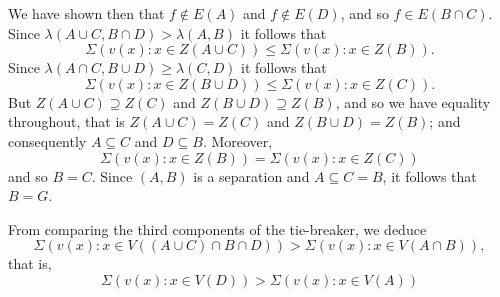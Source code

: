 We have shown then that $f \notin E(A)$ and $f \notin E(D)$, and so $f \in E(B \cap C)$. Since $\lambda(A \cup C, B \cap D) > \lambda(A, B)$ it follows that
\begin{equation*}
\Sigma(v(x) : x \in Z(A \cup C)) \le \Sigma(v(x) : x \in Z(B)).
\end{equation*}
Since $\lambda(A \cap C, B \cup D) \ge \lambda(C, D)$ it follows that
\begin{equation*}
\Sigma(v(x) : x \in Z(B \cup D)) \le \Sigma(v(x) : x \in Z(C)).
\end{equation*}
But $Z(A \cup C) \supseteq Z(C)$ and $Z(B \cup D) \supseteq Z(B)$, and so we have equality throughout, that is $Z(A \cup C) = Z(C)$ and $Z(B \cup D) = Z(B)$; and consequently $A \subseteq C$ and $D \subseteq B$. Moreover,
\begin{equation*}
\Sigma(v(x) : x \in Z(B)) = \Sigma(v(x) : x \in Z(C))
\end{equation*}
and so $B = C$. Since $(A, B)$ is a separation and $A \subseteq C = B$, it follows that $B = G$.

From comparing the third components of the tie-breaker, we deduce
\begin{equation*}
\Sigma(v(x) : x \in V((A \cup C) \cap B \cap D)) > \Sigma(v(x) : x \in V(A \cap B)),
\end{equation*}
that is,
\begin{equation*}
\Sigma(v(x) : x \in V(D)) > \Sigma(v(x) : x \in V(A))
\end{equation*}
